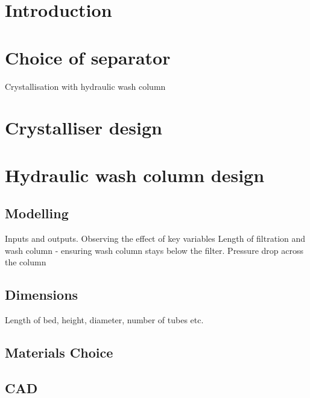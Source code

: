 \section{Introduction}


\section{Choice of separator}
Crystallisation with hydraulic wash column 


\section{Crystalliser design}




\section{Hydraulic wash column design}

\subsection{Modelling}
Inputs and outputs.
Observing the effect of key variables
Length of filtration and wash column - ensuring wash column stays below the filter. 
Pressure drop across the column 


\subsection{Dimensions}
Length of bed, height, diameter, number of tubes etc. 

\subsection{Materials Choice}

\subsection{CAD}


